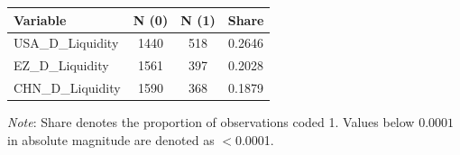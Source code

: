 \begin{tabular}{lccc}
  \toprule
  \textbf{Variable} & \textbf{N (0)} & \textbf{N (1)} & \textbf{Share} \\ 
  \midrule
  USA\_D\_Liquidity & 1440 & 518 & 0.2646 \\ 
  EZ\_D\_Liquidity & 1561 & 397 & 0.2028 \\ 
  CHN\_D\_Liquidity & 1590 & 368 & 0.1879 \\ 
  \bottomrule
\end{tabular}
\par\vspace{4pt}
\begin{minipage}{\linewidth}
  \footnotesize \textit{Note}: Share denotes the proportion of observations coded 1. Values below $0.0001$ in absolute magnitude are denoted as $<$0.0001.
\end{minipage}
